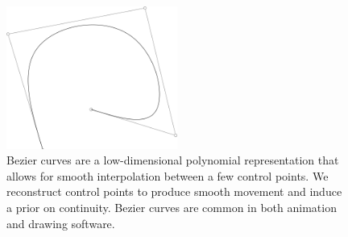 \begin{figure}
    \centering
    \includegraphics[width=0.5\textwidth]{bezier_curve.png}
    \caption{
        Bezier curves are a low-dimensional polynomial representation that allows for smooth interpolation between a few control points. We reconstruct control points to produce smooth movement and induce a prior on continuity. Bezier curves are common in both animation and drawing software.
    }
    \label{fig:bezier_diagram}
\end{figure}

